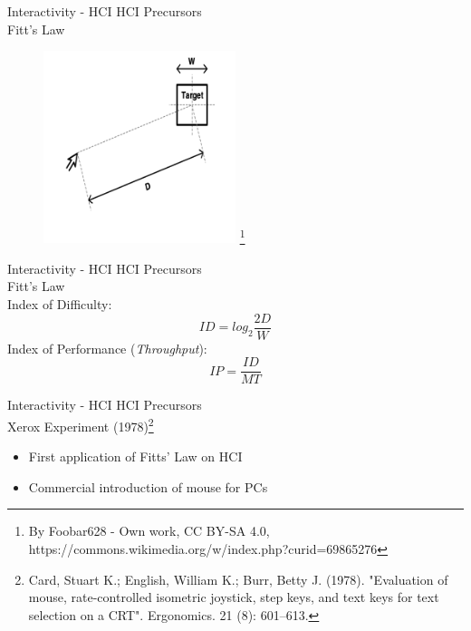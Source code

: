 \documentclass{beamer}
\newcommand\blfootnote[1]{%
  \begingroup
  \renewcommand\thefootnote{}\footnote{#1}%
  \addtocounter{footnote}{-1}%
  \endgroup
}
\begin{document}
\begin{frame}{Interactivity - HCI} 
    HCI Precursors\\
    Fitt's Law
    \begin{figure}[h]
        \includegraphics[width=0.5\textwidth]{fittslaw.png}\blfootnote{By Foobar628 - Own work, CC BY-SA 4.0, https://commons.wikimedia.org/w/index.php?curid=69865276}
    \end{figure}
\end{frame}

\begin{frame}{Interactivity - HCI} 
    HCI Precursors\\
    Fitt's Law\\
    \vspace{5mm}
    Index of Difficulty:
    \begin{equation*}
        ID = log_2\frac{2D}{W}
    \end{equation*}
    Index of Performance (\textit{Throughput}):
    \begin{equation*}
        IP = \frac{ID}{MT}
    \end{equation*}
\end{frame}

\begin{frame}{Interactivity - HCI} 
    HCI Precursors\\
    \vspace{5mm}
    Xerox Experiment (1978)\footnote{Card, Stuart K.; English, William K.; Burr, Betty J. (1978). "Evaluation of mouse, rate-controlled isometric joystick, step keys, and text keys for text selection on a CRT". Ergonomics. 21 (8): 601–613.}\\ 
    \begin{itemize}
        \item First application of Fitts' Law on HCI
        \item Commercial introduction of mouse for PCs
    \end{itemize}
\end{frame}
\end{document}

